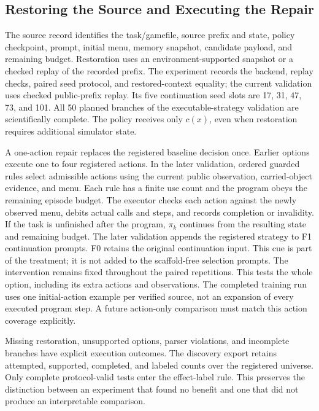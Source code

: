 \subsection{Restoring the Source and Executing the Repair}
\label{app:restoration}
The source record identifies the task/gamefile, source prefix and state,
policy checkpoint, prompt, initial menu, memory snapshot, candidate payload,
and remaining budget. Restoration uses an environment-supported snapshot
or a checked replay of the recorded prefix. The experiment records the
backend, replay checks, paired seed protocol, and restored-context equality;
the current validation uses checked public-prefix replay. Its five
continuation seed slots are 17, 31, 47, 73, and 101. All 50 planned
branches of the executable-strategy validation are scientifically complete. The policy receives only
$c(x)$, even when restoration requires additional simulator state.

A one-action repair replaces the registered baseline decision once. Earlier options execute one to four registered actions. In the later
validation, ordered guarded rules select admissible actions using the
current public observation, carried-object evidence, and menu. Each rule
has a finite use count and the program obeys the remaining episode budget.
The executor checks each action against the newly observed menu, debits
actual calls and steps, and records completion or invalidity. If the task is unfinished after the program, $\pi_k$ continues from the
resulting state and remaining budget. The later validation appends the
registered strategy to F1 continuation prompts. F0 retains the original
continuation input. This cue is part of the treatment; it is not added to
the scaffold-free selection prompts.
The intervention remains fixed throughout the paired repetitions.
This tests the whole option, including its extra actions and observations.
The completed training run uses one initial-action example per verified
source, not an expansion of every executed program step. A future
action-only comparison must match this action coverage explicitly.

Missing restoration, unsupported options, parser violations, and incomplete
branches have explicit execution outcomes. The discovery export retains
attempted, supported, completed, and labeled counts over the registered
universe. Only complete protocol-valid tests enter the effect-label rule.
This preserves the distinction between an experiment that found no benefit
and one that did not produce an interpretable comparison.

